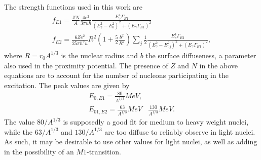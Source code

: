 The strength functions used in this work are
\begin{equation}
\begin{aligned}
f_{E1} =  \frac{ZN}{A}\frac{4e^2}{3\pi u\hbar} \frac{E^4_\gamma \Gamma_{E1}}{(E_\gamma^2 -E^2_0)^2+(E_\gamma \Gamma_{E1})^2}  \\
f_{E2} =  \frac{6Z e^2}{25\pi\hbar^3 u}R^2\left(1+\frac{5}{2}\frac{b^2}{R^2}\right)  \sum_j \frac{1}{2}\frac{E^4_\gamma \Gamma_{E2}}{(E_{\gamma}^2 -E^2_{0j})^2+(E_\gamma \Gamma_{E1})^2},
\end{aligned}
\end{equation}
where $R=r_0 A^{1/3}$ is the nuclear radius and $b$ the surface diffuseness, a parameter also used in the proximity potential. The presence of $Z$ and $N$ in the above equations are to account for the number of nucleons participating in the excitation\cite{Chomaz:1997}.
The peak values are given by
\begin{equation}
\begin{aligned}
E_{0,E1} = \frac{80}{A^{1/3}}\unit{MeV}, &\\
E_{01,E2} = \frac{63}{A^{1/3}}\unit{MeV} &\frac{130}{A^{1/3}}\unit{MeV}.
\end{aligned}
\end{equation}
The value $80/A^{1/3}$ is supposedly a good fit for medium to heavy weight nuclei\cite{Chomaz:1997}, while the $63/A^{1/3}$ and $130/A^{1/3}$ are too diffuse to reliably observe in light nuclei\cite{PhysRevLett.34.748}\cite{speth1991electric}. As such, it may be desirable to use other values for light nuclei, as well as adding in the possibility of an $M1$-transition.





